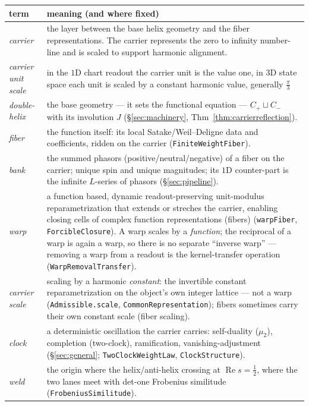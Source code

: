\documentclass[11pt]{article}
\theoremstyle{definition}
\renewcommand{\Re}{\operatorname{Re}}
\begin{document}
\begin{center}
\small
\begin{tabular}{@{}lp{}@{}}
\toprule
term & meaning (and where fixed) \\
\midrule
\emph{carrier} & the layer between the base helix geometry and the fiber representations. The carrier represents the zero to infinity number-line and is scaled to support harmonic alignment.  \\
\emph{carrier unit scale} & in the $1$D chart readout the carrier unit is the value one, in $3$D state space each unit is scaled by a constant harmonic value, generally $\frac{\pi}{3}$ \\
\emph{double-helix} & the base geometry --- it sets the functional equation --- $C_+\sqcup C_-$ with its involution $J$ (\S\ref{sec:machinery}, Thm~\ref{thm:carrierreflection}). \\
\emph{fiber} & the function itself: its local Satake/Weil--Deligne data and coefficients, ridden on the carrier
(\texttt{FiniteWeightFiber}). \\
\emph{bank} & the summed phasors (positive/neutral/negative) of a fiber on the carrier; unique spin and unique magnitudes; its $1$D counter-part is the infinite $L$-series of phasors
(\S\ref{sec:pipeline}). \\
\emph{warp} & a function based, dynamic readout-preserving unit-modulus reparametrization that extends or streches the carrier, enabling closing cells of complex function representations (fibers)
(\texttt{warpFiber}, \texttt{ForcibleClosure}). A warp scales by a \emph{function}; the reciprocal of a warp is again a warp, so there is no separate ``inverse warp'' --- removing a warp from a readout is the kernel-transfer operation (\texttt{WarpRemovalTransfer}). \\
\emph{carrier scale} & scaling by a harmonic \emph{constant}: the invertible constant reparametrization on the object's own integer lattice --- not a warp
(\texttt{Admissible.scale}, \texttt{CommonRepresentation}); fibers sometimes carry their own constant scale (fiber scaling). \\
\emph{clock} & a deterministic oscillation the carrier carries: self-duality ($\mu_2$), completion (two-clock),
ramification, vanishing-adjustment (\S\ref{sec:general}; \texttt{TwoClockWeightLaw}, \texttt{ClockStructure}). \\
\emph{weld} & the origin where the helix/anti-helix crossing at $\Re s=\tfrac12$, where the two lanes meet with det-one Frobenius
similitude (\texttt{FrobeniusSimilitude}). \\

\end{tabular}
\end{center}
\end{document}
